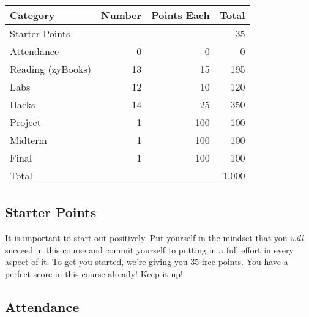 \documentclass[12pt]{scrartcl}
\begin{document}
\begin{table}[h]
\centering



{\small
\setlength{\tabcolsep}{0.5em} %
\renewcommand{\arraystretch}{1.2}%

\begin{tabular}{lrrr}
\hline
\rowcolor{steelblue!50} Category & Number & Points Each & Total \\
\hline
\rowcolor{steelblue!5}  Starter Points    &    &     &  35 \\
\rowcolor{steelblue!10} Attendance        & 0  & 0   &   0 \\
\rowcolor{steelblue!5}  Reading (zyBooks) & 13 & 15  & 195 \\
\rowcolor{steelblue!10} Labs              & 12 & 10  & 120 \\
\rowcolor{steelblue!5}  Hacks             & 14 & 25  & 350 \\
\rowcolor{steelblue!10} Project           & 1  & 100 & 100 \\
\rowcolor{steelblue!5}  Midterm           & 1  & 100 & 100 \\
\rowcolor{steelblue!10} Final             & 1  & 100 & 100 \\
\hline
Total  & & & 1,000 
\end{tabular}
}
\end{table}


\subsection{Starter Points}

It is important to start out positively.  Put yourself in the mindset
that you \emph{will} succeed in this course and commit yourself to
putting in a full effort in every aspect of it.  To get you started,
we're giving you 35 free points.  You have a perfect score in this
course already!  Keep it up!

\subsection{Attendance}
\end{document}
